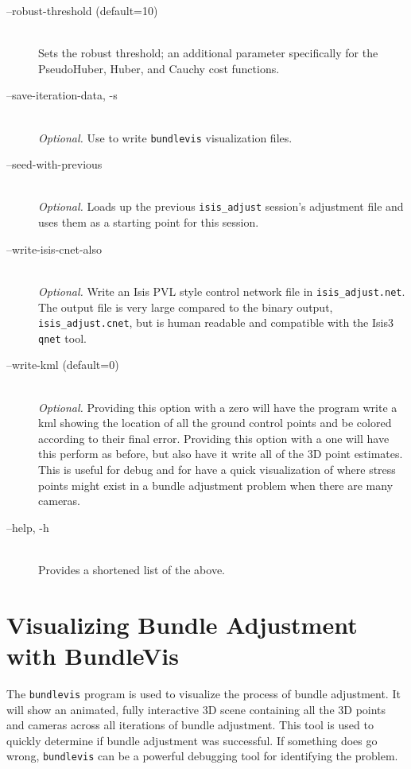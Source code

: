 \begin{description}
\item[--robust-threshold \textnormal{\small{(default=10)}}] \hfill \\
  Sets the robust threshold; an additional parameter specifically for
  the PseudoHuber, Huber, and Cauchy cost functions.

\item[--save-iteration-data, -s] \hfill \\
  \emph{Optional.} Use to write {\tt bundlevis} visualization files.

\item[--seed-with-previous] \hfill \\
  \emph{Optional.} Loads up the previous {\tt isis\_adjust} session's
  adjustment file and uses them as a starting point for this session.

\item[--write-isis-cnet-also] \hfill \\
  \emph{Optional.} Write an Isis PVL style control network file in
  \texttt{isis\_adjust.net}. The output file is very large compared to
  the binary output, \texttt{isis\_adjust.cnet}, but is human readable
  and compatible with the Isis3 \texttt{qnet} tool.

\item[--write-kml \textnormal{\small{(default=0)}}] \hfill \\
  \emph{Optional.} Providing this option with a zero will have the
  program write a kml showing the location of all the ground control
  points and be colored according to their final error. Providing this
  option with a one will have this perform as before, but also have it
  write all of the 3D point estimates. This is useful for debug and
  for have a quick visualization of where stress points might exist in
  a bundle adjustment problem when there are many cameras.

\item[--help, -h] \hfill \\
  Provides a shortened list of the above.

\end{description}

\section{Visualizing Bundle Adjustment with BundleVis}

The \texttt{bundlevis} program is used to visualize the process of
bundle adjustment. It will show an animated, fully interactive 3D
scene containing all the 3D points and cameras across all iterations
of bundle adjustment.  This tool is used to quickly determine if
bundle adjustment was successful.  If something does go wrong,
\texttt{bundlevis} can be a powerful debugging tool for identifying
the problem.

